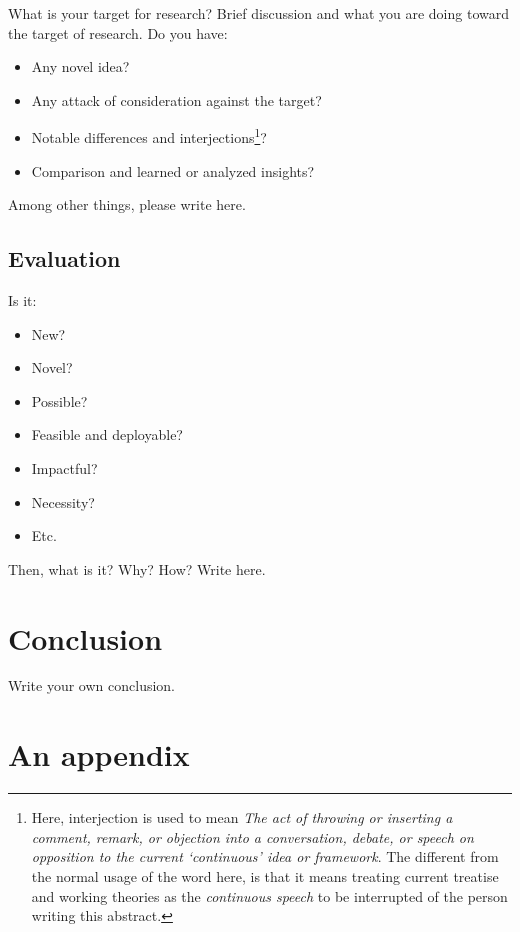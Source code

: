 \documentclass[10pt,a4paper]{article}
\begin{document}
What is your target for research? Brief discussion and what you are doing toward the target of research. Do you have: 
\begin{itemize}
    \item Any novel idea?
    \item Any attack of consideration against the target?
    \item Notable differences and interjections\footnote{Here, interjection is used to mean \textit{The act of throwing or inserting a comment, remark, or objection into a conversation, debate, or speech on opposition to the current `continuous' idea or framework}. The different from the normal usage of the word here, is that it means treating current treatise and working theories as the \textit{continuous speech} to be interrupted of the person writing this abstract.}?
    \item Comparison and learned or analyzed insights?   
\end{itemize}
Among other things, please write here. 
\subsection{Evaluation}
Is it: 
\begin{itemize}
    \item New? 
    \item Novel? 
    \item Possible? 
    \item Feasible and deployable? 
    \item Impactful? 
    \item Necessity? 
    \item Etc.
\end{itemize}
Then, what is it? Why? How? Write here. 
\section{Conclusion}
Write your own conclusion. 






\clearpage

% 
% 

\appendix

\section{An appendix}
\end{document}
